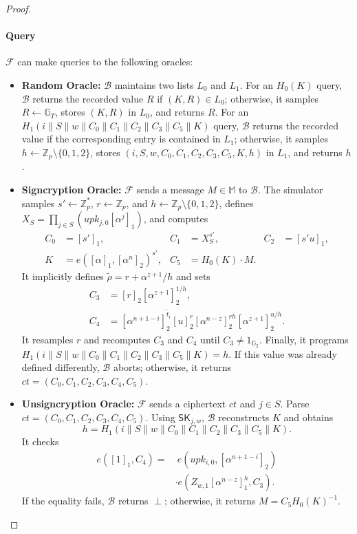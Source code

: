 \documentclass[sigconf,anonymous]{acmart}
\theoremstyle{definition}
\theoremstyle{definition}
\theoremstyle{definition}
\theoremstyle{definition}
\theoremstyle{definition}
\theoremstyle{definition}
\theoremstyle{definition}
\theoremstyle{definition}
\theoremstyle{definition}
\begin{document}
\begin{proof}
	\paragraph{\textbf{Query}}
	$\mathcal{F}$ can make queries to the following oracles:
	
	\begin{itemize}
		
		\item \textbf{Random Oracle:} $\mathcal{B}$ maintains two lists $L_0$ and $L_1$. For an $H_0(K)$ query, $\mathcal{B}$ returns the recorded value $R$ if $(K,R)\in L_0$; otherwise, it samples $R\leftarrow\mathbb{G}_T$, stores $(K,R)$ in $L_0$, and returns $R$. For an $H_1(i\parallel S\parallel w\parallel C_0\parallel C_1\parallel C_2\parallel C_3\parallel C_5\parallel K)$ query, $\mathcal{B}$ returns the recorded value if the corresponding entry is contained in $L_1$; otherwise, it samples $h\leftarrow\mathbb{Z}_p\setminus\{0,1,2\}$, stores $(i,S,w,C_0,C_1,C_2,C_3,C_5,K,h)$ in $L_1$, and returns $h$.
		
		\item \textbf{Signcryption Oracle:} $\mathcal{F}$ sends a message
		$M\in\mathbb{M}$ to $\mathcal{B}$. The simulator samples
		$s'\leftarrow\mathbb{Z}_p^*$, $r\leftarrow\mathbb{Z}_p$, and
		$h\leftarrow\mathbb{Z}_p\setminus\{0,1,2\}$, defines
		$X_S=\prod_{j\in S}(upk_{j,0}[\alpha^j]_1)$, and computes
		\[
		\begin{aligned}
		C_0&=[s']_1, & C_1&=X_S^{s'}, & C_2&=[s'u]_1,\\
		K&=e([\alpha]_1,[\alpha^n]_2)^{s'},
		& C_5&=H_0(K)\cdot M.
		\end{aligned}
		\]
		It implicitly defines $\widetilde\rho=r+\alpha^{z+1}/h$ and sets
		\[
		\begin{aligned}
		C_3&=[r]_2[\alpha^{z+1}]_2^{1/h},\\
		C_4&=[\alpha^{n+1-i}]_2^{\widetilde t_i}[u]_2^r
		[\alpha^{n-z}]_2^{rh}[\alpha^{z+1}]_2^{u/h}.
		\end{aligned}
		\]
		It resamples $r$ and recomputes $C_3$ and $C_4$ until
		$C_3\neq 1_{\mathbb{G}_2}$.
		Finally, it programs
		$H_1(i\parallel S\parallel w\parallel C_0\parallel C_1\parallel
		C_2\parallel C_3\parallel C_5\parallel K)=h$.
		If this value was already defined differently, $\mathcal{B}$ aborts;
		otherwise, it returns $ct=(C_0,C_1,C_2,C_3,C_4,C_5)$.
		
		\item \textbf{Unsigncryption Oracle:} $\mathcal{F}$ sends a
		ciphertext $ct$ and $j\in S$. Parse
		$ct=(C_0,C_1,C_2,C_3,C_4,C_5)$. Using
		$\mathsf{SK}_{j,w}$, $\mathcal{B}$ reconstructs $K$ and obtains
		\[
		h=H_1(i\parallel S\parallel w\parallel C_0\parallel C_1\parallel
		C_2\parallel C_3\parallel C_5\parallel K).
		\]
		It checks
		\[
		\begin{aligned}
		e([1]_1,C_4)=&\ e(upk_{i,0},[\alpha^{n+1-i}]_2)\\
		&\cdot e(Z_{w,1}[\alpha^{n-z}]_1^h,C_3).
		\end{aligned}
		\]
		If the equality fails, $\mathcal{B}$ returns $\perp$; otherwise, it
		returns $M=C_5H_0(K)^{-1}$.
		

\end{itemize}
\end{proof}
\end{document}
